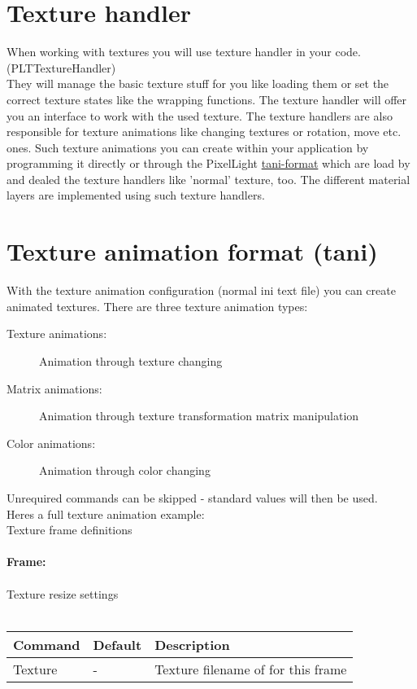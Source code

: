 \section{Texture handler}
When working with textures you will use texture handler in your code. (PLTTextureHandler)\\
They will manage the basic texture stuff for you like loading them or set the correct texture states
like the wrapping functions. The texture handler will offer you an interface to work with the used texture.
The texture handlers are also responsible for texture animations like changing textures or rotation, move etc.
ones. Such texture animations you can create within your application by programming it directly
or through the PixelLight \hyperlink{tani}{tani-format} which are load by and dealed the texture
handlers like 'normal' texture, too.
The different material layers are implemented using such texture handlers.




\section{Texture animation format (tani)}
\hypertarget{tani}{}
With the texture animation configuration (normal ini text file) you can create animated textures.
There are three texture animation types:
\begin{description}
\item[Texture animations:] Animation through texture changing
\item[Matrix animations:]  Animation through texture transformation matrix manipulation
\item[Color animations:]   Animation through color changing
\end{description}
Unrequired commands can be skipped - standard values will then be used.\\

Heres a full texture animation example:\\



Texture frame definitions\\
\\
\textbf{Frame:}\\
\\
Texture resize settings\\
\\
\begin{tabular}{|p{2.5cm}|p{2.5cm}|p{9cm}|}
\hline
\textbf{Command} & \textbf{Default} & \textbf{Description}\\
\hline
Texture & - & Texture filename of for this frame\\
\hline
\end{tabular}


